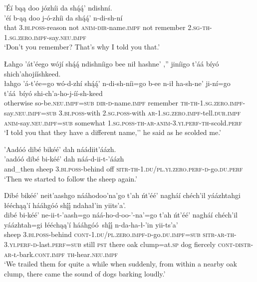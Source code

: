 \ea\label{ex:text6-4-6}
’Éí bąą doo józhíi da shą́ą́’ ndishní.\\
\gll ’éí	b-ąą	doo	j-ó-zhíi	da shą́ą́’	n-di-sh-ní\\
     that	3.\textsc{bi}.\textsc{poss}-reason	not	\textsc{anim}-\textsc{dir}-name.\textsc{impf}	not remember	2.\textsc{sg}-\textsc{th}-1.\textsc{sg}.\textsc{zero}.\textsc{impf}-say.\textsc{neu}.\textsc{impf}\\
\glt `Don't you remember? That's why I told you that.'
\z

\ea\label{ex:text6-4-7}
Łahgo ’át’éego wójí shą́ą́ ndishníigo bee nił hashne’ ,'' jiníigo t’áá bíyó shich’ahojííshkeed.\\
\gll łahgo	’á-t’ée=go	wó-d-zhí shą́ą́’	n-di-sh-níi=go	b-ee	n-ił	ha-sh-ne’	ji-ní=go	t’áá~{bíyó}	shi-ch’a-ho-j-íí-sh-keed\\
     otherwise	so-be.\textsc{neu}.\textsc{impf}=\textsc{sub}	\textsc{dir}-\textsc{d}-name.\textsc{impf} remember	\textsc{th}-\textsc{th}-1.\textsc{sg}.\textsc{zero}.\textsc{impf}-say.\textsc{neu}.\textsc{impf}=\textsc{sub}	3.\textsc{bi}.\textsc{poss}-with	2.\textsc{sg}.\textsc{poss}-with	\textsc{ar}-1.\textsc{sg}.\textsc{zero}.\textsc{impf}-tell.\textsc{dur}.\textsc{impf}	\textsc{anim}-say.\textsc{neu}.\textsc{impf}=\textsc{sub}	somewhat	1.\textsc{sg}.\textsc{poss}-\textsc{th}-\textsc{ar}-\textsc{anim}-3.\textsc{yi}.\textsc{perf}-\textsc{th}-scold.\textsc{perf}\\
\glt `I told you that they have a different name,'' he said as he scolded me.'
\z

\ea\label{ex:text6-5-1}
’Aadóó dibé bikéé’ dah náádiit’áázh.\\
\gll ’aadóó	dibé	bi-kéé’	dah	náá-d-ii-t-’áázh\\
     and\_then	sheep	3.\textsc{bi}.\textsc{poss}-behind	off	\textsc{sitr}-\textsc{th}-1.\textsc{du}/\textsc{pl}.\textsc{yi}.\textsc{zero}.\textsc{perf}-\textsc{d}-go.\textsc{du}.\textsc{perf}\\
\glt `Then we started to follow the sheep again.'
\z

\ea\label{ex:text6-5-2}
Dibé bikéé’ neit’aashgo nááhodoo’na’go t’ah ńt’éé’ nagháí chéch’il yáázhtahgi łééchąą’í hááhgóó shį́į́ ndahał’in yiits’a’.\\
\gll dibé	bi-kéé’	ne-ii-t-’aash=go	náá-ho-d-oo-’-na’=go	t’ah	ńt’éé’	nagháí	chéch’il	yáázhtah=gi	łééchąą’í	hááhgóó~{shį́į́}	n-da-ha-ł-’in	yii-ts’a’\\
     sheep	3.\textsc{bi}.\textsc{poss}-behind	\textsc{cont}-1.\textsc{du}/\textsc{pl}.\textsc{zero}.\textsc{impf}-\textsc{d}-go.\textsc{du}.\textsc{impf}=\textsc{sub}	\textsc{sitr}-\textsc{ar}-\textsc{th}-3.\textsc{yi}.\textsc{perf}-\textsc{d}-last.\textsc{perf}=\textsc{sub}	still	\textsc{pst}	there	oak	clump=at.\textsc{sp}	dog	fiercely	\textsc{cont}-\textsc{distr}-\textsc{ar}-\textsc{ł}-bark.\textsc{cont}.\textsc{impf}	\textsc{th}-hear.\textsc{neu}.\textsc{impf}\\
\glt `We trailed them for quite a while when suddenly, from within a nearby oak clump, there came the sound of dogs barking loudly.'
\z

